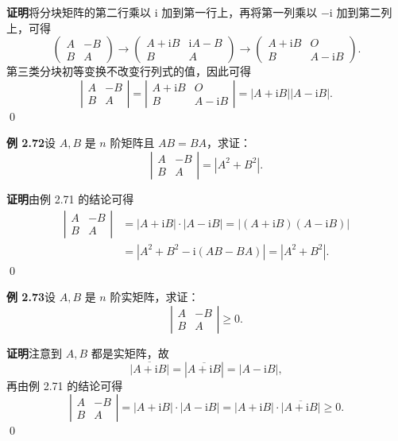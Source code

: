 \documentclass[UTF8,12pt,a4paper,fontset=fandol]{ctexart}
\begin{document}
\noindent\textbf{证明}\quad 将分块矩阵的第二行乘以 $\mathrm i$ 加到第一行上，再将第一列乘以 $-\mathrm i$ 加到第二列上，可得
\[
\left(
\begin{array}{cc}
A & -B\\
B & A
\end{array}
\right)
\to
\left(
\begin{array}{cc}
A+\mathrm iB & \mathrm iA-B\\
B & A
\end{array}
\right)
\to
\left(
\begin{array}{cc}
A+\mathrm iB & O\\
B & A-\mathrm iB
\end{array}
\right).
\]
第三类分块初等变换不改变行列式的值，因此可得
\[
\left|
\begin{array}{cc}
A & -B\\
B & A
\end{array}
\right|
=
\left|
\begin{array}{cc}
A+\mathrm iB & O\\
B & A-\mathrm iB
\end{array}
\right|
=|A+\mathrm iB||A-\mathrm iB|.
\]
\qed

\noindent\textbf{例 2.72}\quad 设 $A,B$ 是 $n$ 阶矩阵且 $AB=BA$，求证：
\[
\left|
\begin{array}{cc}
A & -B\\
B & A
\end{array}
\right|
=|A^2+B^2|.
\]

\noindent\textbf{证明}\quad 由例 2.71 的结论可得
\[
\begin{aligned}
\left|
\begin{array}{cc}
A & -B\\
B & A
\end{array}
\right|
&=|A+\mathrm iB|\cdot|A-\mathrm iB|
=|(A+\mathrm iB)(A-\mathrm iB)|\\
&=|A^2+B^2-\mathrm i(AB-BA)|=|A^2+B^2|.
\end{aligned}
\]
\qed

\noindent\textbf{例 2.73}\quad 设 $A,B$ 是 $n$ 阶实矩阵，求证：
\[
\left|
\begin{array}{cc}
A & -B\\
B & A
\end{array}
\right|\ge0.
\]

\noindent\textbf{证明}\quad 注意到 $A,B$ 都是实矩阵，故
\[
\overline{|A+\mathrm iB|}=|\overline{A+\mathrm iB}|=|A-\mathrm iB|,
\]
再由例 2.71 的结论可得
\[
\left|
\begin{array}{cc}
A & -B\\
B & A
\end{array}
\right|
=|A+\mathrm iB|\cdot|A-\mathrm iB|
=|A+\mathrm iB|\cdot\overline{|A+\mathrm iB|}\ge0.
\]
\qed
\end{document}
